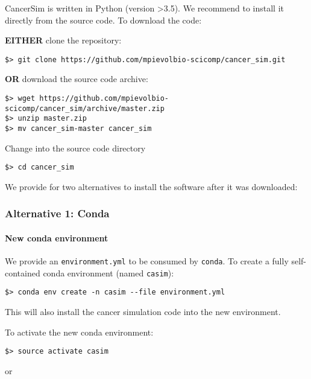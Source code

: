 \documentclass[]{article}
\let\oldparagraph\paragraph
\renewcommand{\paragraph}[1]{\oldparagraph{#1}\mbox{}}
\begin{document}
CancerSim is written in Python (version \textgreater{}3.5). We recommend
to install it directly from the source code. To download the code:

\textbf{EITHER} clone the repository:

\begin{verbatim}
$> git clone https://github.com/mpievolbio-scicomp/cancer_sim.git
\end{verbatim}

\textbf{OR} download the source code archive:

\begin{verbatim}
$> wget https://github.com/mpievolbio-scicomp/cancer_sim/archive/master.zip
$> unzip master.zip
$> mv cancer_sim-master cancer_sim
\end{verbatim}

Change into the source code directory

\begin{verbatim}
$> cd cancer_sim
\end{verbatim}

We provide for two alternatives to install the software after it was
downloaded:

\hypertarget{alternative-1-conda}{%
\subsubsection{Alternative 1: Conda}\label{alternative-1-conda}}

\hypertarget{new-conda-environment}{%
\paragraph{New conda environment}\label{new-conda-environment}}

We provide an \texttt{environment.yml} to be consumed by \texttt{conda}.
To create a fully self-contained conda environment (named
\texttt{casim}):

\begin{verbatim}
$> conda env create -n casim --file environment.yml
\end{verbatim}

This will also install the cancer simulation code into the new
environment.

To activate the new conda environment:

\begin{verbatim}
$> source activate casim
\end{verbatim}

or
\end{document}
